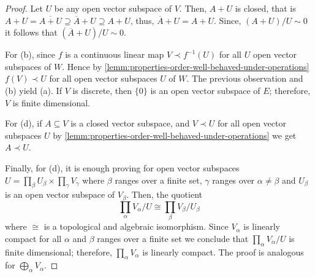 \begin{proof}
	Let $U$ be any open vector subspace of $V$. Then, $A + U$ is closed, that is $A + U = \overline{A + U} \supseteq \overline{A} + U \supseteq A + U$, thus, $\overline{A} + U = A + U$. Since, $(A + U)/U \sim 0$ it follows that $(\overline{A} + U)/U \sim 0$. 

	For (b), since $f$ is a continuous linear map $V \prec f^{-1}(U)$ for all $U$ open vector subspaces of $W$. Hence by \cref{lemm:properties-order-well-behaved-under-operations} $f(V) \prec U$ for all open vector subspaces $U$ of $W$. The previous observation and (b) yield (a). If $V$ is discrete, then $\{0\}$ is an open vector subspace of $E$; therefore, $V$ is finite dimensional.

	For (d), if $A \subseteq V$ is a closed vector subspace, and $V \prec U$ for all open vector subspaces $U$ by \cref{lemm:properties-order-well-behaved-under-operations} we get $A \prec U$. 

	Finally, for (d), it is enough proving for open vector subspaces $U = \prod_{\beta} U_{\beta} \times \prod_{\gamma} V_{\gamma}$ where $\beta$ ranges over a finite set, $\gamma$ ranges over $\alpha \neq \beta$ and $U_{\beta}$ is an open vector subspace of $V_{\beta}$. Then, the quotient
	\[
		\prod_{\alpha}V_{\alpha} / U \cong \prod_{\beta} V_{\beta}/U_{\beta}
	\]
	where $\cong$ is a topological and algebraic isomorphism. Since $V_{\alpha}$ is linearly compact for all $\alpha$ and $\beta$ ranges over a finite set we conclude that $\prod_{\alpha} V_{\alpha} / U$ is finite dimensional; therefore, $\prod_{\alpha} V_{\alpha}$ is linearly compact. The proof is analogous for $\bigoplus_{\alpha} V_{\alpha}$.
\end{proof} 
